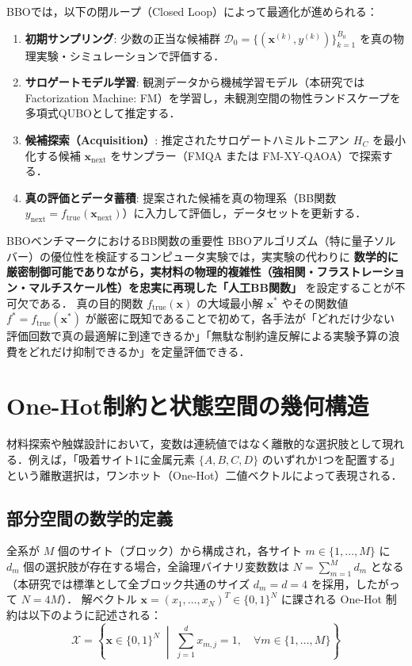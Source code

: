 \documentclass[11pt,a4paper]{ltjsarticle}
\begin{document}
BBOでは，以下の閉ループ（Closed Loop）によって最適化が進められる：
\begin{enumerate}\setlength{\itemsep}{1.5pt}
    \item \textbf{初期サンプリング}: 少数の正当な候補群 $\mathcal{D}_0 = \{(\bm{x}^{(k)}, y^{(k)})\}_{k=1}^{B_0}$ を真の物理実験・シミュレーションで評価する．
    \item \textbf{サロゲートモデル学習}: 観測データから機械学習モデル（本研究では Factorization Machine: FM）を学習し，未観測空間の物性ランドスケープを多項式QUBOとして推定する．
    \item \textbf{候補探索（Acquisition）}: 推定されたサロゲートハミルトニアン $H_C$ を最小化する候補 $\bm{x}_{\mathrm{next}}$ をサンプラー（FMQA または FM-XY-QAOA）で探索する．
    \item \textbf{真の評価とデータ蓄積}: 提案された候補を真の物理系（BB関数 $y_{\mathrm{next}} = f_{\mathrm{true}}(\bm{x}_{\mathrm{next}})$）に入力して評価し，データセットを更新する．
\end{enumerate}

\begin{mybox}{BBOベンチマークにおけるBB関数の重要性}
BBOアルゴリズム（特に量子ソルバー）の優位性を検証するコンピュータ実験では，実実験の代わりに \textbf{数学的に厳密制御可能でありながら，実材料の物理的複雑性（強相関・フラストレーション・マルチスケール性）を忠実に再現した「人工BB関数」} を設定することが不可欠である．
真の目的関数 $f_{\mathrm{true}}(\bm{x})$ の大域最小解 $\bm{x}^*$ やその関数値 $f^* = f_{\mathrm{true}}(\bm{x}^*)$ が厳密に既知であることで初めて，各手法が「どれだけ少ない評価回数で真の最適解に到達できるか」「無駄な制約違反解による実験予算の浪費をどれだけ抑制できるか」を定量評価できる．
\end{mybox}

\section{One-Hot制約と状態空間の幾何構造}
\label{sec:one_hot_geometry}
材料探索や触媒設計において，変数は連続値ではなく離散的な選択肢として現れる．例えば，「吸着サイト1に金属元素 $\{A, B, C, D\}$ のいずれか1つを配置する」という離散選択は，ワンホット（One-Hot）二値ベクトルによって表現される．

\subsection{部分空間の数学的定義}
全系が $M$ 個のサイト（ブロック）から構成され，各サイト $m \in \{1, \dots, M\}$ に $d_m$ 個の選択肢が存在する場合，全論理バイナリ変数数は $N = \sum_{m=1}^M d_m$ となる（本研究では標準として全ブロック共通のサイズ $d_m = d = 4$ を採用，したがって $N = 4M$）．
解ベクトル $\bm{x} = (x_1, \dots, x_N)^T \in \{0, 1\}^N$ に課される One-Hot 制約は以下のように記述される：
\begin{equation}
\mathcal{X} = \left\{ \bm{x} \in \{0, 1\}^N \;\middle|\; \sum_{j=1}^{d} x_{m, j} = 1, \quad \forall m \in \{1, \dots, M\} \right\}
\end{equation}
\end{document}
